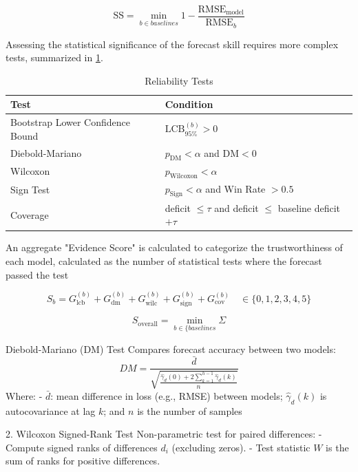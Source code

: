 \documentclass[resources,article,submit,pdftex,moreauthors]{Definitions/mdpi}
\begin{document}
\begin{equation} \label{eq:skill}
    \text{SS} = \min_{b \in {baselines}} 1 - \frac{\text{RMSE}_{\text{model}}}{\text{RMSE}_b}
\end{equation}

Assessing the statistical significance of the forecast skill requires more complex tests, summarized in \ref{tab:stats}. 

\begin{table}[H] 
\caption{Reliability Tests\label{tab:stats}}
\renewcommand{\arraystretch}{1.4}
\begin{tabularx}{\textwidth}{
    >{\hsize=0.8\hsize\raggedleft\arraybackslash}X 
    >{\hsize=1\hsize\raggedright\arraybackslash}X
}
\toprule
\textbf{Test} & \textbf{Condition}\\
\midrule
Bootstrap Lower Confidence Bound & $\text{LCB}_{95\%}^{(b)} > 0$ \\
Diebold-Mariano & $p_{\text{DM}} < \alpha$ and $\text{DM} < 0$ \\
Wilcoxon & $p_{\text{Wilcoxon}} < \alpha$ \\
Sign Test & $p_{\text{Sign}} < \alpha$ and Win Rate $> 0.5$ \\
Coverage & deficit $\leq \tau$ and deficit $\leq$ baseline deficit $+ \tau$

\end{tabularx}
\end{table}

An aggregate "Evidence Score" is calculated to categorize the trustworthiness of each model, calculated as the number of statistical tests where the forecast passed the test 

$$S_b = G_{\text{lcb}}^{(b)} + G_{\text{dm}}^{(b)} + G_{\text{wilc}}^{(b)} + G_{\text{sign}}^{(b)} + G_{\text{cov}}^{(b)} \quad \in \{0, 1, 2, 3, 4, 5\}$$

$$S_{\text{overall}} = \min_{b \in \{baselines} \Sigma $$



Diebold-Mariano (DM) Test
Compares forecast accuracy between two models:
$$
DM = \frac{\bar{d}}{\sqrt{\frac{\hat{\gamma}_d(0) + 2 \sum_{k=1}^{h-1} \hat{\gamma}_d(k)}{n}}}
$$
Where:
- $\bar{d}$: mean difference in loss (e.g., RMSE) between models; $\hat{\gamma}_d(k)$ is autocovariance at lag $k$; and $n$ is the number of samples

2. Wilcoxon Signed-Rank Test
Non-parametric test for paired differences:
- Compute signed ranks of differences $d_i$ (excluding zeros).
- Test statistic $W$ is the sum of ranks for positive differences.
\end{document}
